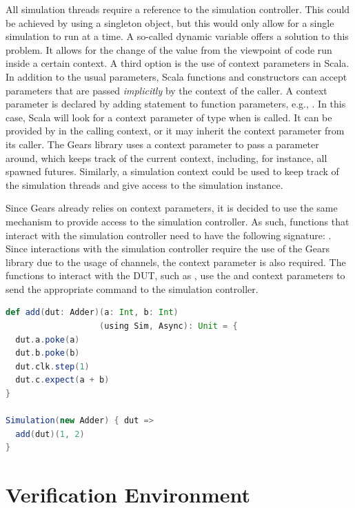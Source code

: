 All simulation threads require a reference to the simulation controller. This could be achieved by using a singleton
object, but this would only allow for a single simulation to run at a time. A so-called dynamic variable offers a solution to this problem. It allows for the change of the value from the viewpoint of code run inside a certain context. 
A third option is the use of context parameters in Scala. In addition to the usual parameters, Scala functions and constructors can accept parameters that are passed \textit{implicitly} by the context of the caller. A context parameter is declared by adding  statement to function parameters, e.g., . In this case, Scala will look for a context parameter of type  when  is called. It can be provided by  in the calling context, or it may inherit the context parameter from its caller. The Gears library uses a context parameter to pass a  parameter around, which keeps track of the current context, including, for instance, all spawned futures. Similarly, a simulation context could be used to keep track of the simulation threads and give access to the simulation instance.

Since Gears already relies on context parameters, it is decided to use the same mechanism to provide access to the simulation controller. As such, functions that interact with the simulation controller need to have the
following signature: . Since interactions with the simulation controller require the use of the Gears library due to the usage of channels, the 
context parameter is also required. The functions to interact with the DUT, such as , use the
 and  context parameters to send the appropriate command to the simulation controller.

\begin{listing}
\begin{lstlisting}[language=scala, captionpos=b, caption=Example code for a function using the simulation context to interact with a DUT.,label=lst:simctx]
def add(dut: Adder)(a: Int, b: Int)
                   (using Sim, Async): Unit = {
  dut.a.poke(a)
  dut.b.poke(b)
  dut.clk.step(1)
  dut.c.expect(a + b)
}

Simulation(new Adder) { dut =>
  add(dut)(1, 2)
}
\end{lstlisting}
\end{listing}

\section{Verification Environment} %


